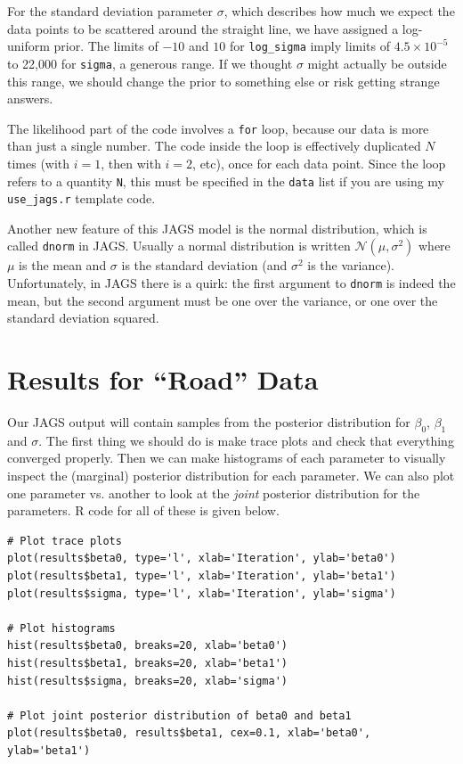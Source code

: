 For the standard deviation parameter $\sigma$, which describes how much we
expect the data points to be scattered around the straight line, we have assigned
a log-uniform prior. The limits of $-10$ and $10$ for {\tt log\_sigma} imply
limits of $4.5 \times 10^{-5}$ to 22,000 for {\tt sigma}, a generous range.
If we thought $\sigma$
might actually be outside this range, we should change the prior to something
else or risk getting strange answers.

The likelihood part of the code involves a {\tt for} loop, because our data
is more than just a single number. The code inside the loop is effectively
duplicated $N$ times (with $i=1$, then with $i=2$, etc), once for each data
point. Since the loop refers to a quantity {\tt N}, this must be specified in
the {\tt data} list if you are using my {\tt use\_jags.r} template code.

Another new feature of this JAGS model is the normal distribution, which is
called {\tt dnorm} in JAGS. Usually a normal distribution is written
$\mathcal{N}(\mu, \sigma^2)$ where $\mu$ is the mean and $\sigma$ is the standard
deviation (and $\sigma^2$ is the variance). Unfortunately, in JAGS there is a
quirk: the first argument to {\tt dnorm} is indeed the mean, but the second argument
must be one over the variance, or one over the standard deviation squared.

\section{Results for ``Road'' Data}
Our JAGS output will contain samples from the posterior distribution for
$\beta_0$, $\beta_1$ and $\sigma$. The first thing we should do is make
trace plots and check that everything converged properly. Then we can make
histograms of each parameter to visually inspect the (marginal) posterior
distribution for each parameter. We can also plot one parameter vs. another
to look at the {\it joint} posterior distribution for the parameters. R code
for all of these is given below.

\begin{framed}
\begin{verbatim}
# Plot trace plots
plot(results$beta0, type='l', xlab='Iteration', ylab='beta0')
plot(results$beta1, type='l', xlab='Iteration', ylab='beta1')
plot(results$sigma, type='l', xlab='Iteration', ylab='sigma')

# Plot histograms
hist(results$beta0, breaks=20, xlab='beta0')
hist(results$beta1, breaks=20, xlab='beta1')
hist(results$sigma, breaks=20, xlab='sigma')

# Plot joint posterior distribution of beta0 and beta1
plot(results$beta0, results$beta1, cex=0.1, xlab='beta0', ylab='beta1')
\end{verbatim}
\end{framed}

